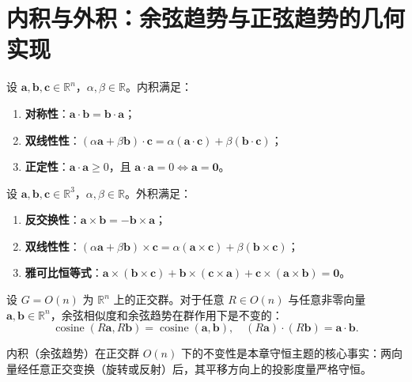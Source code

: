 \section{\texorpdfstring{内积与外积：余弦趋势与正弦趋势的几何实现}{内积与外积：余弦趋势与正弦趋势的几何实现}}

\begin{property}[内积的基本性质]\label{prop:inner_product_properties}
设 $\mathbf{a}, \mathbf{b}, \mathbf{c} \in \mathbb{R}^n$，$\alpha, \beta \in \mathbb{R}$。内积满足：
\begin{enumerate}[label=(\roman*)]
    \item \textbf{对称性}：$\mathbf{a} \cdot \mathbf{b} = \mathbf{b} \cdot \mathbf{a}$；
    \item \textbf{双线性性}：$(\alpha\mathbf{a} + \beta\mathbf{b}) \cdot \mathbf{c} = \alpha(\mathbf{a}\cdot\mathbf{c}) + \beta(\mathbf{b}\cdot\mathbf{c})$；
    \item \textbf{正定性}：$\mathbf{a} \cdot \mathbf{a} \ge 0$，且 $\mathbf{a}\cdot\mathbf{a} = 0 \iff \mathbf{a} = \mathbf{0}$。
\end{enumerate}
\end{property}

\begin{property}[外积的基本性质]\label{prop:outer_product_properties}
设 $\mathbf{a}, \mathbf{b}, \mathbf{c} \in \mathbb{R}^3$，$\alpha, \beta \in \mathbb{R}$。外积满足：
\begin{enumerate}[label=(\roman*)]
    \item \textbf{反交换性}：$\mathbf{a} \times \mathbf{b} = -\mathbf{b} \times \mathbf{a}$；
    \item \textbf{双线性性}：$(\alpha\mathbf{a} + \beta\mathbf{b}) \times \mathbf{c} = \alpha(\mathbf{a}\times\mathbf{c}) + \beta(\mathbf{b}\times\mathbf{c})$；
    \item \textbf{雅可比恒等式}：$\mathbf{a} \times (\mathbf{b} \times \mathbf{c}) + \mathbf{b} \times (\mathbf{c} \times \mathbf{a}) + \mathbf{c} \times (\mathbf{a} \times \mathbf{b}) = \mathbf{0}$。
\end{enumerate}
\end{property}

\begin{proposition}\label{prop:cosine_scalar}
设 $G = O(n)$ 为 $\mathbb{R}^n$ 上的正交群。对于任意 $R \in O(n)$ 与任意非零向量 $\mathbf{a}, \mathbf{b} \in \mathbb{R}^n$，余弦相似度和余弦趋势在群作用下是不变的：
\[\operatorname{cosine}(R\mathbf{a}, R\mathbf{b}) = \operatorname{cosine}(\mathbf{a}, \mathbf{b}), \quad (R\mathbf{a}) \cdot (R\mathbf{b}) = \mathbf{a} \cdot \mathbf{b}.\]

内积（余弦趋势）在正交群 $O(n)$ 下的不变性是本章守恒主题的核心事实：两向量经任意正交变换（旋转或反射）后，其平移方向上的投影度量严格守恒。
\end{proposition}

